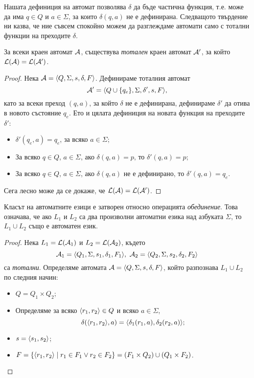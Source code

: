 Нашата дефиниция на автомат позволява $\delta$ да бъде частична функция, т.е.
може да има $q\in Q$ и $a\in\Sigma$, за които $\delta(q,a)$ не е дефинирана.
Следващото твърдение ни казва, че ние съвсем спокойно можем да разглеждаме автомати
само с тотални функции на преходите  $\delta$.
\begin{prop}
  За всеки краен автомат $\mathcal{A}$, съществува {\em тотален} краен автомат $\mathcal{A}'$,
  за който $\mathcal{L}(\mathcal{A}) = \mathcal{L}(\mathcal{A}')$.
\end{prop}
\begin{proof}
  Нека $\mathcal{A} = \langle{Q,\Sigma,s,\delta,F}\rangle$.
  Дефинираме тоталния автомат 
  \[\mathcal{A}' = \langle{Q\cup\{q_e\}, \Sigma, \delta', s, F}\rangle,\]
  като за всеки преход $(q,a)$, за който $\delta$ не е дефинирана, 
  дефинираме $\delta'$ да отива в новото състояние $q_e$.
  Ето и цялата дефиниция на новата функция на преходите $\delta'$:
  \begin{itemize}
  \item 
    $\delta'(q_e,a) = q_e$, за всяко $a\in\Sigma$;
  \item
    За всяко $q\in Q$, $a\in\Sigma$, ако $\delta(q,a) = p$, то
    $\delta'(q,a) = p$;
  \item
    За всяко $q\in Q$, $a\in\Sigma$, ако $\delta(q,a)$ не е дефинирано, то
    $\delta'(q,a) = q_e$.
  \end{itemize}
  Сега лесно може да се докаже, че $\mathcal{L}(\mathcal{A}) = \mathcal{L}(\mathcal{A}')$.
\end{proof}

\begin{prop}
  \label{pr:automata-union}
  Класът на автоматните езици е затворен относно операцията {\em обединение}.
  Това означава, че ако $L_1$ и $L_2$ са два произволни автоматни езика над азбуката $\Sigma$, то $L_1\cup L_2$
  също е автоматен език.
\end{prop}
\begin{proof}
  Нека $L_1 = \mathcal{L}(\mathcal{A}_1)$ и $L_2 = \mathcal{L}(\mathcal{A}_2)$, 
  където \[\mathcal{A}_1 = \langle{Q_1,\Sigma,s_1,\delta_1,F_1}\rangle,\ \mathcal{A}_2 = \langle{Q_2,\Sigma,s_2,\delta_2,F_2}\rangle\] са {\em тотални}.
  Определяме автомата $\mathcal{A} = \langle{Q,\Sigma,s,\delta,F}\rangle$, който разпознава $L_1\cup L_2$ по следния начин:
  \begin{itemize}
  \item
    $Q = Q_1\times Q_2$;
  \item
    Определяме за всяко $\langle{r_1,r_2}\rangle \in Q$ и всяко $a \in \Sigma$,
    \[\delta(\langle{r_1,r_2}\rangle,a) = \langle{\delta_1(r_1,a),\delta_2(r_2,a)}\rangle;\]
  \item
    $s = \langle{s_1,s_2}\rangle$;
  \item
    $F = \{\langle{r_1,r_2}\rangle\mid r_1\in F_1\vee r_2 \in F_2\} = (F_1\times Q_2)\cup (Q_1\times F_2)$.
  \end{itemize}
\end{proof}

